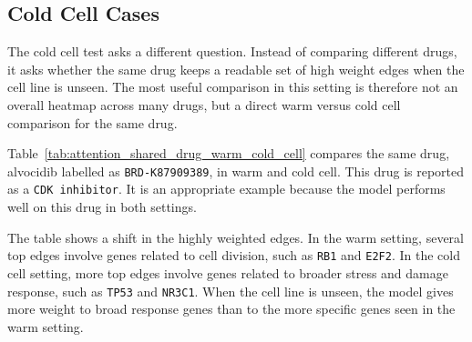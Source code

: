 \subsection*{Cold Cell Cases}
\noindent The cold cell test asks a different question. Instead of comparing different drugs, it asks whether the same drug keeps a readable set of high weight edges when the cell line is unseen. The most useful comparison in this setting is therefore not an overall heatmap across many drugs, but a direct warm versus cold cell comparison for the same drug.

\noindent Table~\ref{tab:attention_shared_drug_warm_cold_cell} compares the same drug, alvocidib labelled as \texttt{BRD-K87909389}, in warm and cold cell. This drug is reported as a \texttt{CDK inhibitor}. It is an appropriate example because the model performs well on this drug in both settings.

\noindent The table shows a shift in the highly weighted edges. In the warm setting, several top edges involve genes related to cell division, such as \texttt{RB1} and \texttt{E2F2}. In the cold cell setting, more top edges involve genes related to broader stress and damage response, such as \texttt{TP53} and \texttt{NR3C1}. When the cell line is unseen, the model gives more weight to broad response genes than to the more specific genes seen in the warm setting.

